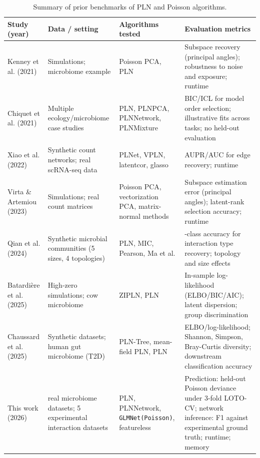 \documentclass{jmlr}
\begin{document}
\begin{table}[htbp]
\caption{Summary of prior benchmarks of PLN and Poisson algorithms.}
\centering
\footnotesize
\setlength{\tabcolsep}{3pt}
\begin{tabular}{>{\raggedright\arraybackslash}p{2.5cm}>{\raggedright\arraybackslash}p{3.2cm}>{\raggedright\arraybackslash}p{3.2cm}>{\raggedright\arraybackslash}p{4.1cm}}
\toprule
Study (year) & Data / setting & Algorithms tested & Evaluation metrics \\
\midrule
Kenney et al. (2021)~\cite{Kenney2021PoissonPCA} & Simulations; microbiome example & Poisson PCA, PLN & Subspace recovery (principal angles); robustness to noise and exposure; runtime \\
\midrule
Chiquet et al. (2021)~\cite{Chiquet2021} & Multiple ecology/microbiome case studies & PLN, PLNPCA, PLNNetwork, PLNMixture & BIC/ICL for model order selection; illustrative fits across tasks; no held-out evaluation \\
\midrule
Xiao et al. (2022)~\cite{Xiao2022PLNet} & Synthetic count networks; real scRNA-seq data & PLNet, VPLN, latentcor, glasso & AUPR/AUC for edge recovery; runtime \\
\midrule
Virta \& Artemiou (2023)~\cite{Virta2023PoissonPCA} & Simulations; real count matrices & Poisson PCA, vectorization PCA, matrix-normal methods & Subspace estimation error (principal angles); latent-rank selection accuracy; runtime \\
\midrule
Qian et al. (2024)~\cite{Qian2024} & Synthetic microbial communities (5 sizes, 4 topologies) & PLN, MIC, Pearson, Ma et al. & 3-class accuracy for interaction type recovery; topology and size effects \\
\midrule
Batardi\`ere et al. (2025)~\cite{Batardiere2025ZIPLN} & High-zero simulations; cow microbiome & ZIPLN, PLN & In-sample log-likelihood (ELBO/BIC/AIC); latent dispersion; group discrimination \\
\midrule
Chaussard et al. (2025)~\cite{Chaussard2025PLNTree} & Synthetic datasets; human gut microbiome (T2D) & PLN-Tree, mean-field PLN, PLN & ELBO/log-likelihood; Shannon, Simpson, Bray-Curtis diversity; downstream classification accuracy \\
\midrule
This work (2026) & 28 real microbiome datasets; 5 experimental interaction datasets & PLN, PLNNetwork, \texttt{GLMNet(Poisson)}, featureless & Prediction: held-out Poisson deviance under 3-fold LOTO-CV; network inference: F1 against experimental ground truth; runtime; memory \\
\bottomrule
\end{tabular}
\label{tab:related_work}
\end{table}
\end{document}
